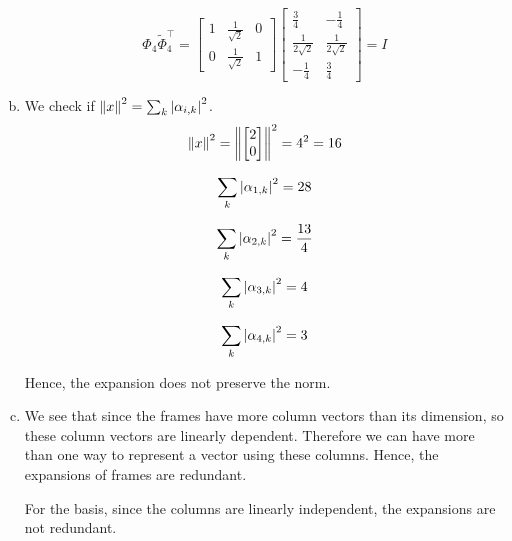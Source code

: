 \begin{enumerate}[(a)]
\[\Phi_4 \tilde{\Phi}_4^\top = \begin{bmatrix}1 & \frac{1}{\sqrt{2}} & 0 \\ 0 & \frac{1}{\sqrt{2}} & 1\end{bmatrix} \begin{bmatrix} \frac{3}{4} & -\frac{1}{4} \\ \frac{1}{2\sqrt{2}} & \frac{1}{2\sqrt{2}} \\ -\frac{1}{4} & \frac{3}{4} \end{bmatrix} = I\]

\item We check if $\left\lVert x \right\rVert^2 = \sum_k\left\lvert \alpha_{i,k} \right\rvert^2$.
\[\left\lVert x \right\rVert^2 = \left\lVert \begin{bmatrix} 2\\0 \end{bmatrix} \right\rVert^2 = 4^2 = 16\]

\[\sum_k\left\lvert \alpha_{1,k} \right\rvert^2 = 28\]

\[\sum_k\left\lvert \alpha_{2,k} \right\rvert^2 = \frac{13}{4}\]

\[\sum_k\left\lvert \alpha_{3,k} \right\rvert^2 = 4\]

\[\sum_k\left\lvert \alpha_{4,k} \right\rvert^2 = 3\]

Hence, the expansion does not preserve the norm.

\item We see that since the frames have more column vectors than its dimension, so these column vectors are linearly dependent. Therefore we can have more than one way to represent a vector using these columns. Hence,  the expansions of frames are redundant. 

For the basis, since the columns are linearly independent, the expansions are not redundant.
\end{enumerate}